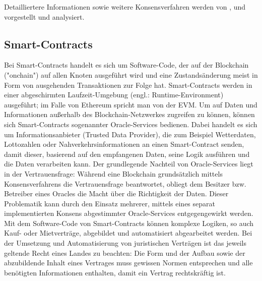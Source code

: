 Detailliertere Informationen sowie weitere Konsensverfahren werden von \cite{Salimitari2018ASO}, \cite{overview2017} und \cite{consensusIOT2018} vorgestellt und analysiert.

\subsection{Smart-Contracts}
\label{subsec:fundamentals:dlt:smartcontracts}
Bei Smart-Contracts handelt es sich um Software-Code, der auf der Blockchain ("onchain") auf allen Knoten ausgeführt wird und eine Zustandsänderung meist in Form von ausgehenden Transaktionen zur Folge hat. Smart-Contracts werden in einer abgeschirmten Laufzeit-Umgebung (engl.: Runtime-Environment) ausgeführt; im Falle von Ethereum spricht man von der \ac{EVM}. Um auf Daten und Informationen außerhalb des Blockchain-Netzwerkes zugreifen zu können, können sich Smart-Contracts sogenannter Oracle-Services bedienen. Dabei handelt es sich um Informationsanbieter (Trusted Data Provider), die zum Beispiel Wetterdaten, Lottozahlen oder Nahverkehrsinformationen an einen Smart-Contract senden, damit dieser, basierend auf den empfangenen Daten, seine Logik ausführen und die Daten verarbeiten kann. Der grundlegende Nachteil von Oracle-Services liegt in der Vertrauensfrage: Während eine Blockchain grundsätzlich mittels Konsensverfahrens die Vertrauensfrage beantwortet, obliegt dem Besitzer bzw. Betreiber eines Oracles die Macht über die Richtigkeit der Daten. Dieser Problematik kann durch den Einsatz mehrerer, mittels eines separat implementierten Konsens abgestimmter Oracle-Services entgegengewirkt werden.\\
Mit dem Software-Code von Smart-Contracts können komplexe Logiken, so auch Kauf- oder Mietverträge, abgebildet und automatisiert abgearbeitet werden. Bei der Umsetzung und Automatisierung von juristischen Verträgen ist das jeweils geltende Recht eines Landes zu beachten: Die Form und der Aufbau sowie der abzubildende Inhalt eines Vertrages muss gewissen Normen entsprechen und alle benötigten Informationen enthalten, damit ein Vertrag rechtskräftig ist.


